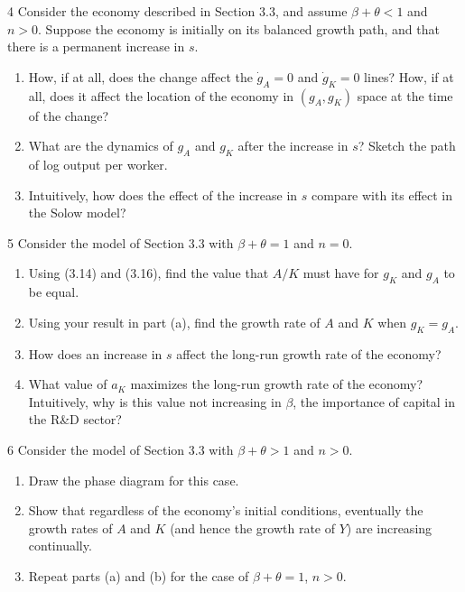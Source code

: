 \begin{problem}{4}
Consider the economy described in Section 3.3, and assume \(\beta+\theta<1\) and \(n>0\). Suppose the economy is initially on its balanced growth path, and that there is a permanent increase in \(s\).
\begin{enumerate}[label=(\alph*)]
    \item How, if at all, does the change affect the \(\dot{g}_A=0\) and \(\dot{g}_K=0\) lines? How, if at all, does it affect the location of the economy in \(\left(g_A,g_K\right)\) space at the time of the change?
    \item What are the dynamics of \(g_A\) and \(g_K\) after the increase in \(s\)? Sketch the path of log output per worker.
    \item Intuitively, how does the effect of the increase in \(s\) compare with its effect in the Solow model?
\end{enumerate}
\end{problem}

\begin{problem}{5}
Consider the model of Section 3.3 with \(\beta+\theta=1\) and \(n=0\).
\begin{enumerate}[label=(\alph*)]
    \item Using (3.14) and (3.16), find the value that \(A/K\) must have for \(g_K\) and \(g_A\) to be equal.
    \item Using your result in part (a), find the growth rate of \(A\) and \(K\) when \(g_K=g_A\).
    \item How does an increase in \(s\) affect the long-run growth rate of the economy?
    \item What value of \(a_K\) maximizes the long-run growth rate of the economy? Intuitively, why is this value not increasing in \(\beta\), the importance of capital in the R\&D sector?
\end{enumerate}
\end{problem}

\begin{problem}{6}
Consider the model of Section 3.3 with \(\beta+\theta>1\) and \(n>0\).
\begin{enumerate}[label=(\alph*)]
    \item Draw the phase diagram for this case.
    \item Show that regardless of the economy's initial conditions, eventually the growth rates of \(A\) and \(K\) (and hence the growth rate of \(Y\)) are increasing continually.
    \item Repeat parts (a) and (b) for the case of \(\beta+\theta=1\), \(n>0\).
\end{enumerate}
\end{problem}


